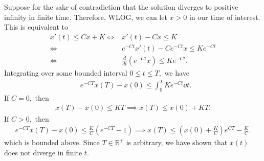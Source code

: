 \documentclass{article}
\numberwithin{equation}{section}
\begin{document}
\begin{enumerate}
\begin{enumerate}[label=(\alph*)]
        Suppose for the sake of contradiction that the solution diverges to positive infinity in finite time. Therefore, WLOG, we can let $x>0$ in our time of interest. This is equivalent to 
        \begin{align}
            x'(t) \le Cx + K \iff & x'(t) - Cx \le K \\ 
            \iff & e^{-Ct}x'(t) - Ce^{-Ct}x \le Ke^{-Ct} \\
            \iff & \frac{d}{dt}(e^{-Ct}x) \le Ke^{-Ct}.
        \end{align}
        Integrating over some bounded interval $0\le t \le T,$ we have 
        \begin{align}
            &e^{-CT}x(T) - x(0) \le \int_0^T Ke^{-Ct}\dd{t}.
        \end{align}
        If $C=0,$ then 
        \begin{align}
            x(T) - x(0) \le KT \implies x(T) \le x(0) + KT.
        \end{align}
        If $C>0,$ then 
        \begin{align}
            e^{-CT}x(T) - x(0) \le \frac{K}{C}\left(e^{-CT} - 1\right) \implies x(T) \le \left(x(0)+\frac{K}{C}\right)e^{CT}-\frac{K}{C}.
        \end{align}
        which is bounded above. Since $T \in \mathbb{R}^+$ is arbitrary, we have shown that $x(t)$ does not diverge in finite $t.$


\end{enumerate}
\end{enumerate}
\end{document}
